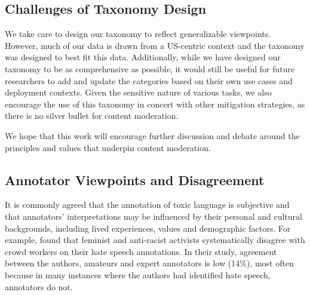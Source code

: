 \documentclass[letterpaper]{article} %
\begin{document}






\subsection{Challenges of Taxonomy Design}

We take care to design our taxonomy to reflect generalizable viewpoints. However, much of our data is drawn from a US-centric context and the taxonomy was designed to best fit this data. Additionally, while we have designed our taxonomy to be as comprehensive as possible, it would still be useful for future researchers to add and update the categories based on their own use cases and deployment contexts. Given the sensitive nature of various tasks, we also encourage the use of this taxonomy in concert with other mitigation strategies, as there is no silver bullet for content moderation.

We hope that this work will encourage further discussion and debate around the principles and values that underpin content moderation. 



\subsection{Annotator Viewpoints and Disagreement}

It is commonly agreed that the annotation of toxic language is subjective and that annotators' interpretations may be influenced by their personal and cultural backgrounds, including lived experiences, values and demographic factors. For example, \citet{waseem2016racist} found that feminist and anti-racist activists systematically disagree with crowd workers on their hate speech annotations. In their study, agreement between the authors, amateurs and expert annotators is low (14$\%$), most often because in many instances where the authors had identified hate speech, annotators do not. 
\end{document}
